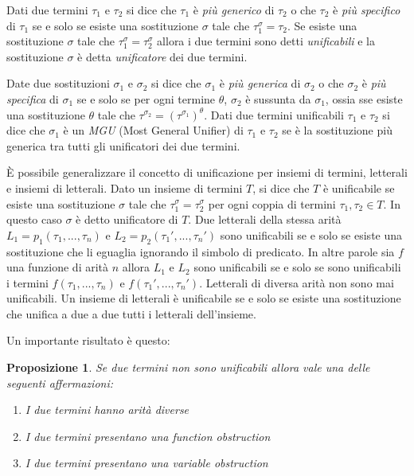 \documentclass[./main.tex]{subfiles}
\begin{document}
Dati due termini $\tau_1$ e $\tau_2$ si dice che $\tau_1$ è \textit{più generico} di $\tau_2$ o che $\tau_2$ è \textit{più specifico} di $\tau_1$
se e solo se esiste una sostituzione $\sigma$ tale che $\tau_1^\sigma = \tau_2$.
Se esiste una sostituzione $\sigma$ tale che $\tau_1^\sigma = \tau_2^\sigma$ allora i due termini sono detti \textit{unificabili} e 
la sostituzione $\sigma$ è detta \textit{unificatore} dei due termini.


Date due sostituzioni $\sigma_1$ e $\sigma_2$ si dice che $\sigma_1$ 
è \textit{più generica} di $\sigma_2$ o che $\sigma_2$ è \textit{più specifica} di $\sigma_1$ se e solo se 
per ogni termine $\theta$, $\sigma_2$ è sussunta da $\sigma_1$, 
ossia sse esiste una sostituzione $\theta$ tale che $\tau^{\sigma_2} = {(\tau^{\sigma_1})}^\theta$.
Dati due termini unificabili $\tau_1$ e $\tau_2$ si dice che $\sigma_1$ è un \textit{MGU} (Most General Unifier) di $\tau_1$ e $\tau_2$ 
se è la sostituzione più generica tra tutti gli unificatori dei due termini.


È possibile generalizzare il concetto di unificazione per insiemi di termini, letterali e insiemi di letterali.
Dato un insieme di termini $T$, si dice che $T$ è unificabile se esiste una sostituzione $\sigma$ tale che $\tau_1^\sigma = \tau_2^\sigma$
per ogni coppia di termini $\tau_1, \tau_2 \in T$. In questo caso $\sigma$ è detto unificatore di $T$. 
Due letterali della stessa arità $L_1 = p_1(\tau_1, ..., \tau_n)$ e $L_2 = p_2(\tau_1', ..., \tau_n')$ 
sono unificabili se e solo se esiste una sostituzione che li eguaglia ignorando il simbolo di predicato.
In altre parole sia $f$ una funzione di arità $n$ allora $L_1$ e $L_2$ sono unificabili se e solo se sono unificabili i termini
$f(\tau_1, ..., \tau_n)$ e $f(\tau_1', ..., \tau_n')$.
Letterali di diversa arità non sono mai unificabili.
Un insieme di letterali è unificabile se e solo se esiste una sostituzione che unifica a due a due tutti i letterali dell'insieme.


Un importante risultato è questo:
\newtheorem{proposition}{Proposizione}
\begin{proposition}
  Se due termini non sono unificabili allora vale una delle seguenti affermazioni:
  \begin{enumerate}
    \item I due termini hanno arità diverse
    \item I due termini presentano una function obstruction 
    \item I due termini presentano una variable obstruction
  \end{enumerate}
\end{proposition}
\end{document}
